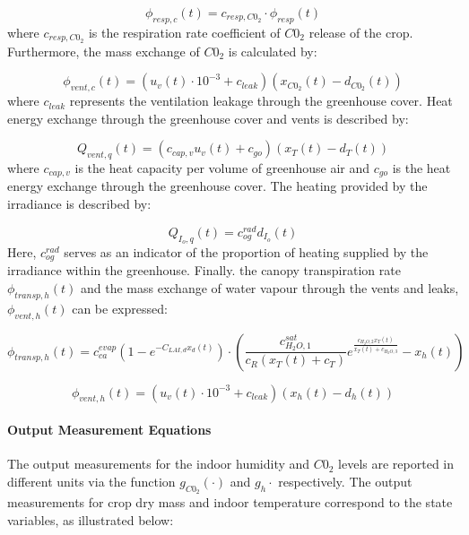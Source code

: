 \begin{equation}
	\phi_{resp,c}(t) = c_{resp,C0_2} \cdot \phi_{resp}(t)
	\label{ co2 respiration rate}
\end{equation}
where $c_{resp,C0_2}$ is the respiration rate coefficient of $C0_2$ release of the crop. Furthermore, the mass exchange of $C0_2$ is calculated by:

\begin{equation}
	\phi_{vent,c}(t) = (u_v(t) \cdot 10^{-3} + c_{leak})(x_{C0_2}(t) - d_{C0_2}(t))
	\label{eq:co2 exchange}
\end{equation}
where $c_{leak}$ represents the ventilation leakage through the greenhouse cover. Heat energy exchange through the greenhouse cover and vents is described by:

\begin{equation}
	Q_{vent,q}(t) = (c_{cap,v}u_v(t) + c_{go})(x_T(t) - d_T(t))
	\label{heat exchange}
\end{equation}
where $c_{cap,v}$ is the heat capacity per volume of greenhouse air and $c_{go}$ is the heat energy exchange through the greenhouse cover. The heating provided by the irradiance is described by:

\begin{equation}
	Q_{I_o,q}(t) = c_{og}^{rad} d_{I_o}(t)
\end{equation}
Here, $c_{og}^{rad}$ serves as an indicator of the proportion of heating supplied by the irradiance within the greenhouse. Finally. the canopy transpiration rate $\phi_{transp,h}(t)$ and the mass exchange of water vapour through the vents and leaks, $\phi_{vent,h}(t)$ can be expressed:

\begin{equation}
	\phi_{transp,h}(t) = c_{ca}^{evap}(1 - e^{-C_{LAI,d} x_d(t)})\cdot \left( \frac{c_{H_2O,1}^{sat}}{c_R(x_T(t)+c_T)} e^{\frac{c_{H_2O,2}x_T(t)}{x_T(t) + c_{H_2O,3}}} - x_h(t) \right)
\end{equation}

\begin{equation}
	\phi_{vent,h}(t) = (u_v(t) \cdot 10^{-3} + c_{leak})(x_h(t) - d_h(t))
\end{equation}

\paragraph{Output Measurement Equations}
The output measurements for the indoor humidity and $C0_2$ levels are reported in different units via the function $g_{C0_2}(\cdot)$ and $g_h{\cdot}$ respectively.  The output measurements for crop dry mass and indoor temperature correspond to the state variables, as illustrated below:

